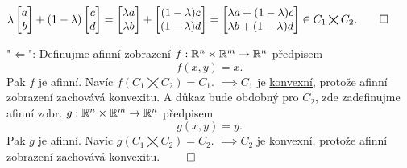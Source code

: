 $
\lambda \begin{bmatrix}
    a \\
    b
\end{bmatrix}
+ (1-\lambda)
\begin{bmatrix}
    c \\
    d
\end{bmatrix} =
\begin{bmatrix}
    \lambda a \\
    \lambda b
\end{bmatrix}
+
\begin{bmatrix}
    (1-\lambda)c \\
    (1-\lambda)d
\end{bmatrix}
=
\begin{bmatrix} %
    \lambda a + (1-\lambda)c \\
    \lambda b + (1-\lambda)d
\end{bmatrix} \in C_1 \bigtimes C_2. \qed$

"$\Leftarrow$": Definujme \hyperref[sec:afin]{afinní} zobrazení $f : \mathbb{R}^n \times \mathbb{R}^m \rightarrow \mathbb{R}^n$ předpisem
\[ f(x,y) = x \text{.}\]
Pak $f$ je afinní. Navíc $f(C_1 \bigtimes C_2) = C_1$. $\implies C_1$ je \hyperref[sec:konvex]{konvexní}, protože afinní zobrazení zachovává
konvexitu.
A důkaz bude obdobný pro $C_2$, zde zadefinujme afinní zobr. $g : \mathbb{R}^n \times \mathbb{R}^m \rightarrow \mathbb{R}^n$ předpisem
\[ g(x,y) = y \text{.}\]
Pak $g$ je afinní. Navíc $g(C_1 \bigtimes C_2) = C_2$. $\implies C_2$ je konvexní, protože afinní zobrazení zachovává
konvexitu. $\qed$

